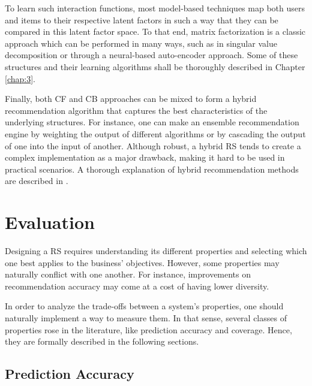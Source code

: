     To learn such interaction functions, most model-based techniques map both users and items to their respective latent factors in such a way that they can be compared in this latent factor space. To that end, matrix factorization is a classic approach which can be performed in many ways, such as in singular value decomposition or through a neural-based auto-encoder approach. Some of these structures and their learning algorithms shall be thoroughly described in Chapter \ref{chap:3}.

    Finally, both CF and CB approaches can be mixed to form a hybrid recommendation algorithm that captures the best characteristics of the underlying structures. For instance, one can make an ensemble recommendation engine by weighting the output of different algorithms or by cascading the output of one into the input of another. Although robust, a hybrid RS tends to create a complex implementation as a major drawback, making it hard to be used in practical scenarios. A thorough explanation of hybrid recommendation methods are described in \cite{10.1023/A:1021240730564}.


\section{Evaluation}



Designing a RS requires understanding its different properties and selecting which one best applies to the business' objectives. However, some properties may naturally conflict with one another. For instance, improvements on recommendation accuracy may come at a cost of having lower diversity. 

In order to analyze the trade-offs between a system's properties, one should naturally implement a way to measure them. In that sense, several classes of properties rose in the literature, like prediction accuracy and coverage. Hence, they are formally described in the following sections. 

\subsection{Prediction Accuracy}

